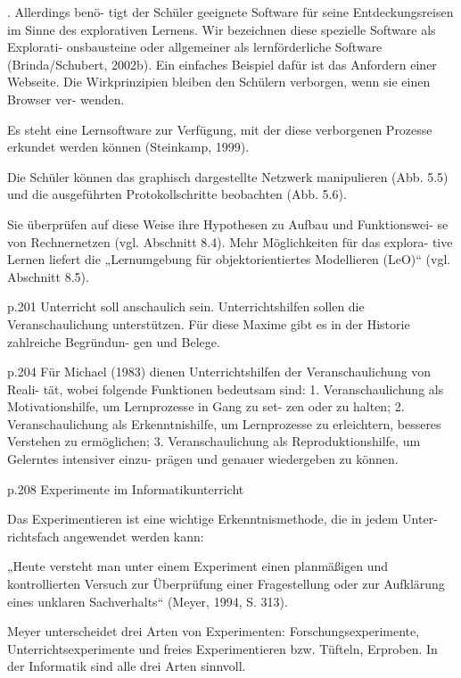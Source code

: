 . Allerdings benö-
tigt der Schüler geeignete Software für seine Entdeckungsreisen im Sinne des 
explorativen  Lernens.  Wir  bezeichnen  diese  spezielle  Software  als  Explorati-
onsbausteine  oder  allgemeiner  als  lernförderliche  Software (Brinda/Schubert, 
2002b).  Ein  einfaches  Beispiel  dafür  ist  das  Anfordern  einer  Webseite.  Die 
Wirkprinzipien bleiben den Schülern verborgen, wenn sie einen Browser ver-
wenden. 

Es steht eine Lernsoftware zur Verfügung, mit der diese verborgenen Prozesse 
erkundet werden können (Steinkamp, 1999). 
 
Die  Schüler  können  das  graphisch  dargestellte  Netzwerk  manipulieren  (Abb. 
5.5) und die ausgeführten Protokollschritte beobachten (Abb. 5.6). 

Sie überprüfen auf diese Weise ihre Hypothesen zu Aufbau und Funktionswei-
se von Rechnernetzen (vgl. Abschnitt 8.4). Mehr Möglichkeiten für das explora-
tive  Lernen  liefert  die  „Lernumgebung  für  objektorientiertes  Modellieren 
(LeO)“ (vgl. Abschnitt 8.5). 

p.201
Unterricht soll anschaulich sein. Unterrichtshilfen sollen die Veranschaulichung 
unterstützen. Für diese Maxime gibt es in der Historie zahlreiche Begründun-
gen und Belege. 

p.204
Für Michael (1983) dienen Unterrichtshilfen der Veranschaulichung von Reali-
tät, wobei folgende Funktionen bedeutsam sind: 
1.  Veranschaulichung als Motivationshilfe, um Lernprozesse in Gang zu set-
zen oder zu halten; 
2.  Veranschaulichung  als  Erkenntnishilfe,  um  Lernprozesse  zu  erleichtern, 
besseres Verstehen zu ermöglichen; 
3.  Veranschaulichung als Reproduktionshilfe, um Gelerntes intensiver einzu-
prägen und genauer wiedergeben zu können. 

p.208
Experimente im Informatikunterricht 

Das Experimentieren ist eine wichtige Erkenntnismethode, die in jedem Unter-
richtsfach angewendet werden kann:  

„Heute  versteht  man  unter  einem  Experiment  einen  planmäßigen  und  kontrollierten 
Versuch  zur  Überprüfung  einer  Fragestellung  oder  zur  Aufklärung  eines  unklaren 
Sachverhalts“ (Meyer, 1994, S. 313). 

Meyer  unterscheidet  drei  Arten  von  Experimenten:  Forschungsexperimente, 
Unterrichtsexperimente und freies Experimentieren bzw. Tüfteln, Erproben. In 
der Informatik sind alle drei Arten sinnvoll. 

